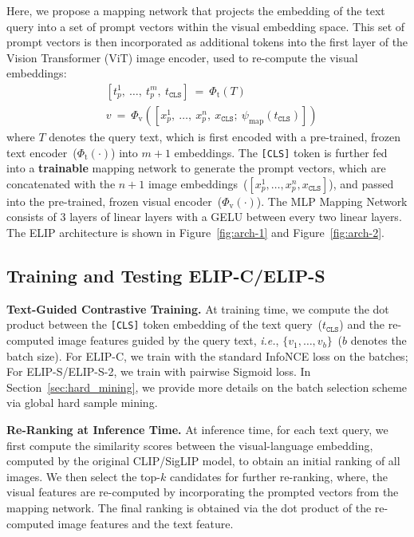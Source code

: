 Here, we propose a mapping network that projects the embedding of the text query into a set of prompt vectors within the visual embedding space. This set of prompt vectors is then incorporated as additional tokens into the first layer of the Vision Transformer (ViT) image encoder, used to re-compute the visual embeddings:
\begin{align*}
&[t_p^1, \ \dots, \ t_p^m, \ t_{\texttt{CLS}}] \ = \ \Phi_{\text{t}}(T)\\
&v \ = \ \Phi_{\text{v}}([x_p^1, \ \dots, \ x_p^n, \ x_{\texttt{CLS}}; \ \psi_{\text{map}}(t_{\texttt{CLS}})])
\end{align*}
where $T$ denotes the query text, which is first encoded with a pre-trained, frozen text encoder~($\Phi_{\text{t}}(\cdot)$) into $m+1$ embeddings. 
The \texttt{[CLS]} token is further fed into a \textbf{trainable} mapping network to generate the prompt vectors, which are concatenated with the $n+1$ image embeddings~($[x_p^1, \dots, x_p^n, x_{\texttt{CLS}}]$), and passed into the pre-trained, frozen visual encoder~($\Phi_{\text{v}}(\cdot)$). 
The MLP Mapping Network consists of 3 layers of linear layers with a GELU between every two linear layers. 
The ELIP architecture is shown in Figure~\ref{fig:arch-1} and Figure~\ref{fig:arch-2}.



\subsection{Training and Testing ELIP-C/ELIP-S}
\label{sec:arch-clip}

\noindent \textbf{Text-Guided Contrastive Training.}
At training time, we compute the dot product between the \texttt{[CLS]} token embedding of the text query~($t_{\texttt{CLS}}$) and the re-computed image features guided by the query text, {\em i.e.}, $\{v_1, \dots, v_b\}$~($b$ denotes the batch size). For ELIP-C, we train with the standard InfoNCE loss on the batches; 
For ELIP-S/ELIP-S-2, we train with pairwise Sigmoid loss. 
In Section~\ref{sec:hard_mining}, we provide more details on the batch selection scheme via global hard sample mining.

\vspace{2pt} \noindent \textbf{Re-Ranking at Inference Time.} 
At inference time, for each text query, 
we first compute the similarity scores between the visual-language embedding, computed by the original CLIP/SigLIP model, to obtain an initial ranking of all images. We then select the top-$k$ candidates for further re-ranking, where, the visual features are re-computed by incorporating the prompted vectors from the mapping network. The final ranking is obtained via the dot product of the re-computed image features and the text feature.

